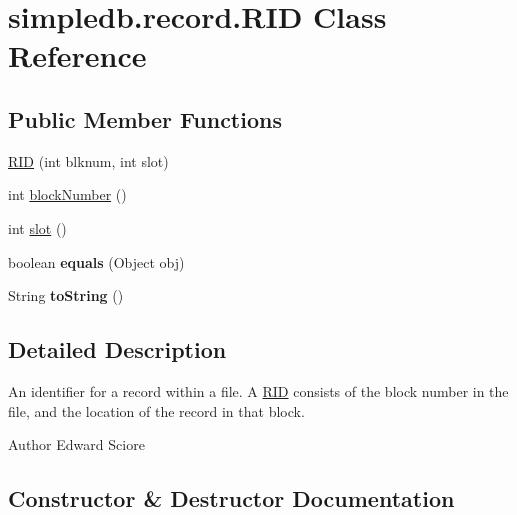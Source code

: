 \hypertarget{classsimpledb_1_1record_1_1RID}{}\section{simpledb.\+record.\+R\+ID Class Reference}
\label{classsimpledb_1_1record_1_1RID}
\subsection*{Public Member Functions}
\begin{DoxyCompactItemize}
\item 
\hyperlink{classsimpledb_1_1record_1_1RID_aeb35927fc958b9a219bfedd94804372e}{R\+ID} (int blknum, int slot)
\item 
int \hyperlink{classsimpledb_1_1record_1_1RID_adb8274ea23b81d3c0a06e5d2bb8da896}{block\+Number} ()
\item 
int \hyperlink{classsimpledb_1_1record_1_1RID_ac8ee042c2b776110c3a47b8979357f45}{slot} ()
\item 
\mbox{\label{classsimpledb_1_1record_1_1RID_ad9008e2021f12d179729ba057214676b}} 
boolean {\bfseries equals} (Object obj)
\item 
\mbox{\label{classsimpledb_1_1record_1_1RID_a7414bf55628ba956de7eea96d60089ae}} 
String {\bfseries to\+String} ()
\end{DoxyCompactItemize}


\subsection{Detailed Description}
An identifier for a record within a file. A \hyperlink{classsimpledb_1_1record_1_1RID}{R\+ID} consists of the block number in the file, and the location of the record in that block. \begin{DoxyAuthor}{Author}
Edward Sciore 
\end{DoxyAuthor}


\subsection{Constructor \& Destructor Documentation}
\mbox{\label{classsimpledb_1_1record_1_1RID_aeb35927fc958b9a219bfedd94804372e}} 
